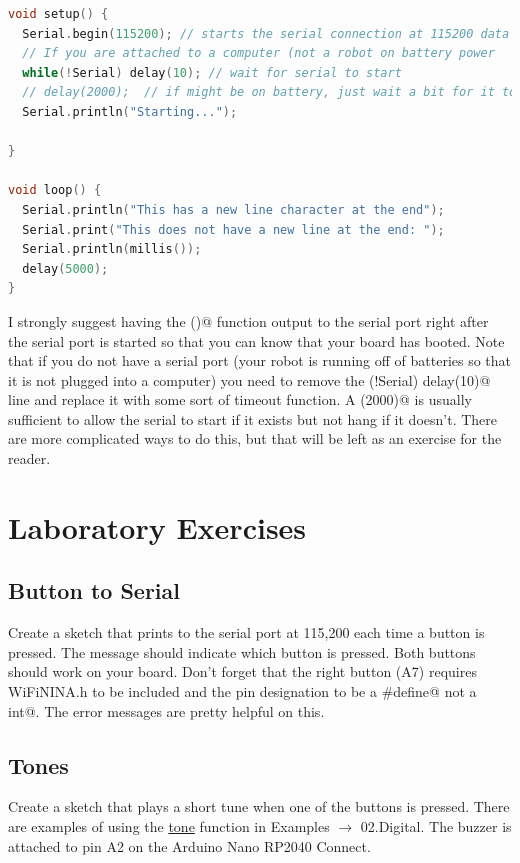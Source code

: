 \begin{lstlisting}[language=C++, caption={This is an example of how to start the serial port at 112,500 in the Arduino system.},label={lst:serial}]
void setup() {
  Serial.begin(115200); // starts the serial connection at 115200 data (baud) rate
  // If you are attached to a computer (not a robot on battery power
  while(!Serial) delay(10); // wait for serial to start
  // delay(2000);  // if might be on battery, just wait a bit for it to start
  Serial.println("Starting...");

}

void loop() {
  Serial.println("This has a new line character at the end");
  Serial.print("This does not have a new line at the end: ");
  Serial.println(millis());
  delay(5000);
}
\end{lstlisting}
I strongly suggest having the \lstinline@setup()@ function output to the serial port right after the serial port is started 
so that you can know that your board has booted. Note that if you do not have a serial port (your robot is running off of 
batteries so that it is not plugged into a computer) you need to remove the \lstinline@while(!Serial) delay(10)@ line and 
replace it with some sort of timeout function. A \lstinline@delay(2000)@ is usually sufficient to allow the serial to start 
if it exists but not hang if it doesn't. There are more complicated ways to do this, but that will be left as an exercise 
for the reader.


\section{Laboratory Exercises}
\subsection{Button to Serial}
Create a sketch that prints to the serial port at 115,200 each time a button is pressed. The message should indicate which
button is pressed. Both buttons should work on your board. Don't forget that the right button (A7) requires WiFiNINA.h to
be included and the pin designation to be a \lstinline@#define@ not a \lstinline@const int@. The error messages are pretty helpful on this.

\subsection{Tones}
Create a sketch that plays a short tune when one of the buttons is pressed. There are examples of using the 
\href{https://www.arduino.cc/reference/en/language/functions/advanced-io/tone/}{tone} 
function in Examples $\rightarrow$ 02.Digital. The buzzer is attached to pin A2 on the Arduino Nano RP2040 Connect.

